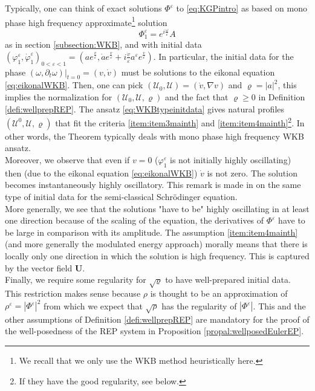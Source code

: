 \documentclass[a4paper, 15pt]{article}
\numberwithin{equation}{section}
\begin{document}
Typically, one can think of exact solutions $\Phi^\varepsilon$ to \eqref{eq:KGPintro} as based on mono phase high frequency approximate\footnote{We recall that we only use the WKB method heuristically here.} solution 
\begin{equation}
\label{eq:WKBtypeinitdata}
    \Phi_1^\varepsilon=e^{i\frac{\omega}{\varepsilon}}A
\end{equation}
as in section \ref{subsection:WKB}, and with initial data $(\varphi_1^\varepsilon,\dot{\varphi}_1^\varepsilon)_{0<\varepsilon<1}=(a e^{\frac{v}{\varepsilon}},\dot{a} e^{\frac{v}{\varepsilon}}+i\frac{\dot{v}}{\varepsilon}a^\varepsilon e^{\frac{v}{\varepsilon}})$. In particular, the initial data for the phase $(\omega,\partial_t\omega)|_{t=0}=(v,\dot{v})$ must be solutions to the eikonal equation \eqref{eq:eikonalWKB}. Then, one can pick $(\mathscr{U}_0,\mathscr{U})=(\dot{v},\nabla v)$ and $\varrho=|a|^2$, this implies the normalization for $(\mathscr{U}_0,\mathscr{U},\varrho)$ and the fact that $\varrho\geq0$ in Definition \ref{defi:wellprepREP}. The ansatz \eqref{eq:WKBtypeinitdata} gives natural profiles $(\mathscr{U}^0,\mathscr{U},\varrho)$ that fit the criteria \ref{item:item3mainth} and \ref{item:item4mainth}\footnote{If they have the good regularity, see below.}. In other words, the Theorem typically deals with mono phase high frequency WKB ansatz. \\
Moreover, we observe that even if $v=0$ ($\varphi_1^\varepsilon$ is not initially highly oscillating) then (due to the eikonal equation \eqref{eq:eikonalWKB}) $\dot{v}$ is not zero. The solution becomes instantaneously highly oscillatory. This remark is made in \cite{zbMATH05243173} on the same type of initial data for the semi-classical Schrödinger equation. \\
More generally, we see that the solutions "have to be" highly oscillating in at least one direction because of the scaling of the equation, the derivatives of $\Phi^\varepsilon$ have to be large in comparison with its amplitude. The assumption \ref{item:item4mainth} (and more generally the modulated energy approach) morally means that there is locally only one direction in which the solution is high frequency. This is captured by the vector field $\textbf{U}$.\\
Finally, we require some regularity for $\sqrt{\varrho}$ to have well-prepared initial data. This restriction makes sense because $\rho$ is thought to be an approximation of $\rho^\varepsilon=|\Phi^\varepsilon|^2$ from which we expect that $\sqrt{\rho}$ has the regularity of $|\Phi^\varepsilon|$. This and the other assumptions of Definition \ref{defi:wellprepREP} are mandatory for the proof of the well-posedness of the REP system in Proposition \ref{propal:wellposedEulerEP}. \\
\end{document}
